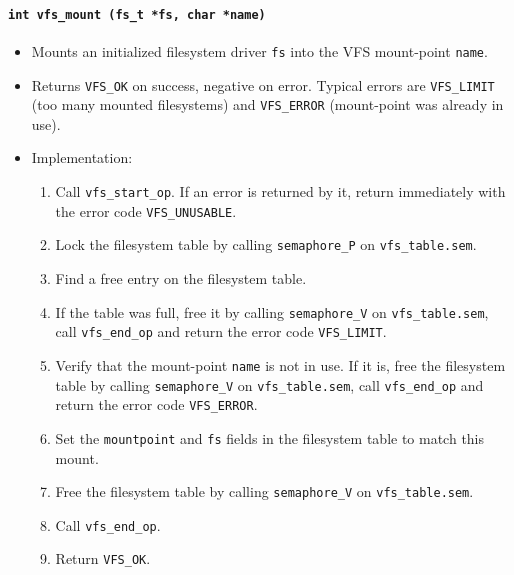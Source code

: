\documentclass[twoside,a4paper]{report}
\makeatletter
\newenvironment{function}[3]{%
\paragraph{\texttt{#1 {\textbf{#2}} (#3)}}%
\index{#2@\texttt{#2}}%
\begin{itemize}%
}{%
\end{itemize}%
}
\makeatother
\begin{document}
\begin{function}{int}{vfs\_mount}{fs\_t *fs, char *name}

\item Mounts an initialized filesystem driver \texttt{fs} into the VFS
mount-point \texttt{name}.

\item Returns \texttt{VFS\_OK} on success, negative on error. Typical
errors are \texttt{VFS\_LIMIT} (too many mounted filesystems) and
\texttt{VFS\_ERROR} (mount-point was already in use).

\item Implementation:
\begin{enumerate}

\item Call \texttt{vfs\_start\_op}. If an error is returned by it,
 return immediately with the error code \texttt{VFS\_UNUSABLE}.

\item Lock the filesystem table by calling \texttt{semaphore\_P} on
\texttt{vfs\_table.sem}.

\item Find a free entry on the filesystem table.

\item If the table was full, free it by calling \texttt{semaphore\_V}
on \texttt{vfs\_table.sem}, call \texttt{vfs\_end\_op} and return the
error code \texttt{VFS\_LIMIT}.

\item Verify that the mount-point \texttt{name} is not in use. If it
is, free the filesystem table by calling \texttt{semaphore\_V} on
\texttt{vfs\_table.sem}, call \texttt{vfs\_end\_op} and return the
error code \texttt{VFS\_ERROR}.

\item Set the \texttt{mountpoint} and \texttt{fs} fields in the
filesystem table to match this mount.

\item Free the filesystem table by calling \texttt{semaphore\_V} on
\texttt{vfs\_table.sem}.

\item Call \texttt{vfs\_end\_op}.

\item Return \texttt{VFS\_OK}.

\end{enumerate}
\end{function}

\end{document}
